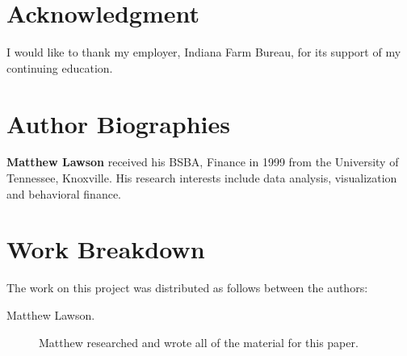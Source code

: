 \documentclass[9pt,twocolumn,twoside]{../../styles/osajnl}
\begin{document}
\section{Acknowledgment}

I would like to thank my employer, Indiana Farm Bureau, for its support of my continuing education.




 
\section*{Author Biographies}
\begingroup
\setlength\intextsep{0pt}
\begin{minipage}[t][3.2cm][t]{1.0\columnwidth} %
  \noindent
  {\bfseries Matthew Lawson} received his BSBA, Finance in 1999 from
  the University of Tennessee, Knoxville. His research interests include
  data analysis, visualization and behavioral finance.
\end{minipage}
\endgroup

\appendix

\section{Work Breakdown}

The work on this project was distributed as follows between the
authors:

\begin{description}

\item[Matthew Lawson.] Matthew researched and wrote all of the material for this paper.

\end{description}
\end{document}
